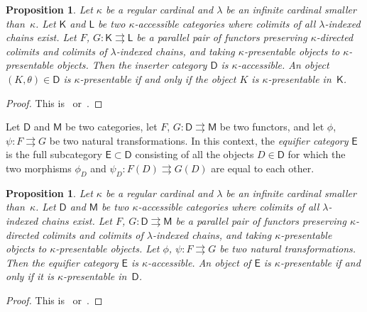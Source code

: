\documentclass[12pt,a4paper]{amsart}
\newcommand{\+}{\protect\nobreakdash-}
\renewcommand{\:}{\colon}
\newcommand{\sD}{\mathsf D}
\newcommand{\sE}{\mathsf E}
\newcommand{\sK}{\mathsf K}
\newcommand{\sL}{\mathsf L}
\newcommand{\sM}{\mathsf M}
\theoremstyle{plain}
\newtheorem{prop}[thm]{Proposition}
\theoremstyle{definition}
\begin{document}
\begin{prop} \label{inserter-accessible-prop}
 Let\/ $\kappa$ be a regular cardinal and\/ $\lambda$ be an infinite
cardinal smaller than\/~$\kappa$.
 Let\/ $\sK$ and\/ $\sL$ be two\/ $\kappa$\+accessible categories
where colimits of all\/ $\lambda$\+indexed chains exist.
  Let $F$, $G\:\sK\rightrightarrows\sL$ be a parallel pair of functors
preserving\/ $\kappa$\+directed colimits and colimits of
$\lambda$\+indexed chains, and taking\/ $\kappa$\+presentable objects
to\/ $\kappa$\+presentable objects.
 Then the inserter category\/ $\sD$ is\/ $\kappa$\+accessible.
 An object $(K,\theta)\in\sD$ is\/ $\kappa$\+presentable if and only
if the object $K$ is\/ $\kappa$\+presentable in\/~$\sK$.
\end{prop}

\begin{proof}
 This is~\cite[Theorem~3.8, Corollary~3.9, and Remark~3.11(II)]{Ulm}
or~\cite[Theorem~4.1]{Pacc}.
\end{proof}

 Let $\sD$ and $\sM$ be two categories, let
$F$, $G\:\sD\rightrightarrows\sM$ be two functors, and let
$\phi$, $\psi\:F\rightrightarrows G$ be two natural transformations.
 In this context, the \emph{equifier category} $\sE$ is the full
subcategory $\sE\subset\sD$ consisting of all the objects $D\in\sD$
for which the two morphisms $\phi_D$ and $\psi_D\:F(D)\rightrightarrows
G(D)$ are equal to each other.

\begin{prop} \label{equifier-accessible-prop}
 Let\/ $\kappa$ be a regular cardinal and\/ $\lambda$ be an infinite
cardinal smaller than\/~$\kappa$.
 Let\/ $\sD$ and\/ $\sM$ be two\/ $\kappa$\+accessible categories
where colimits of all\/ $\lambda$\+indexed chains exist.
  Let $F$, $G\:\sD\rightrightarrows\sM$ be a parallel pair of functors
preserving\/ $\kappa$\+directed colimits and colimits of
$\lambda$\+indexed chains, and taking\/ $\kappa$\+presentable objects
to\/ $\kappa$\+presentable objects.
 Let\/ $\phi$, $\psi\:F\rightrightarrows G$ be two natural
transformations.
 Then the equifier category\/ $\sE$ is\/ $\kappa$\+accessible.
 An object of\/ $\sE$ is\/ $\kappa$\+presentable if and only if it is\/
$\kappa$\+presentable in\/~$\sD$.
\end{prop}

\begin{proof}
 This is~\cite[Theorem~3.8, Corollary~3.9, and Remark~3.11(II)]{Ulm}
or~\cite[Theorem~3.1]{Pacc}.
\end{proof}
\end{document}
